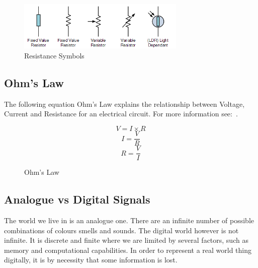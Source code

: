 %
\begin{figure}[ht]
	\centering
	\includegraphics[width=8cm]{images/04}
	\caption{Resistance Symbols \citep{et-15}}
	\label{fig:resistance_symbols}
\end{figure}
%

\subsection*{Ohm's Law}
The following equation Ohm's Law explains the relationship between Voltage, Current and Resistance for an electrical circuit. For more information see:~\citep{et-14}.

%
\begin{figure}[ht]
	\centering
	\begin{equation}
	V = I \times R
	\end{equation}
	\begin{equation}
	I = \frac{V}{R}
	\end{equation}
	\begin{equation}
	R = \frac{V}{I} 
	\end{equation}
	\caption{Ohm's Law}
	\label{fig:ohms_law_equation}
\end{figure}
%


\subsection*{Analogue vs Digital Signals}

The world we live in is an analogue one. There are an infinite number of possible combinations of colours smells and sounds. The digital world however is not infinite. It is discrete and finite where we are limited by several factors, such as memory and computational capabilities. In order to represent a real world thing digitally, it is by necessity that some information is lost.

